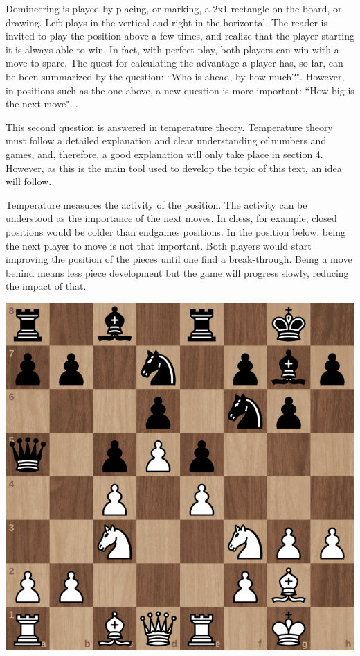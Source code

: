 Domineering is played by placing, or marking, a 2x1 rectangle on the board, or drawing. Left plays in the vertical and right in the horizontal. The reader is invited to play the position above a few times, and realize that the player starting it is always able to win. In fact, with perfect play, both players can win with a move to spare. The quest for calculating the advantage a player has, so far, can be been summarized by the question: ``Who is ahead, by how much?". However, in positions such as the one above, a new question is more important: ``How big is the next move". .

This second question is answered in temperature theory. Temperature theory must follow a detailed explanation and clear understanding of numbers and games, and, therefore, a good explanation will only take place in section 4. However, as this is the main tool used to develop the topic of this text, an idea will follow.

Temperature measures the activity of the position. The activity can be understood as the importance of the next moves. In chess, for example, closed positions would be colder than endgames positions. In the position below, being the next player to move is not that important. Both players would start improving the position of the pieces until one find a break-through. Being a move behind means less piece development but the game will progress slowly, reducing the impact of that.

\begin{center}
\includegraphics[scale=0.15]{images/chess_cold} 
\end{center}

